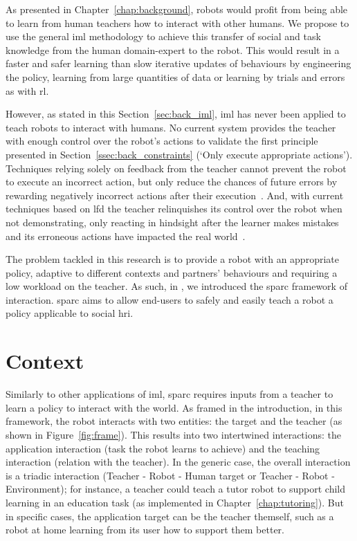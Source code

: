As presented in Chapter~\ref{chap:background}, robots would profit from being able to learn from human teachers how to interact with other humans. We propose to use the general \gls{iml} methodology to achieve this transfer of social and task knowledge from the human domain-expert to the robot. This would result in a faster and safer learning than slow iterative updates of behaviours by engineering the policy, learning from large quantities of data or learning by trials and errors as with \gls{rl}.

However, as stated in this Section~\ref{sec:back_iml}, \gls{iml} has never been applied to teach robots to interact with humans. No current system provides the teacher with enough control over the robot's actions to validate the first principle presented in Section~\ref{ssec:back_constraints} (`Only execute appropriate actions'). Techniques relying solely on feedback from the teacher cannot prevent the robot to execute an incorrect action, but only reduce the chances of future errors by rewarding negatively incorrect actions after their execution~\citep{senft2017supervised}. And, with current techniques based on \gls{lfd} the teacher relinquishes its control over the robot when not demonstrating, only reacting in hindsight after the learner makes mistakes and its erroneous actions have impacted the real world~\citep{chernova2009interactive}.

The problem tackled in this research is to provide a robot with an appropriate policy, adaptive to different contexts and partners' behaviours and requiring a low workload on the teacher. As such, in \cite{senft2015sparc}, we introduced the \gls{sparc} framework of interaction. \gls{sparc} aims to allow end-users to safely and easily teach a robot a policy applicable to social \gls{hri}.

\section{Context}

Similarly to other applications of \gls{iml}, \gls{sparc} requires inputs from a teacher to learn a policy to interact with the world. As framed in the introduction, in this framework, the robot interacts with two entities: the target and the teacher (as shown in Figure~\ref{fig:frame}). This results into two intertwined interactions: the application interaction (task the robot learns to achieve) and the teaching interaction (relation with the teacher). In the generic case, the overall interaction is a triadic interaction (Teacher - Robot - Human target or Teacher - Robot - Environment); for instance, a teacher could teach a tutor robot to support child learning in an education task (as implemented in Chapter~\ref{chap:tutoring}). But in specific cases, the application target can be the teacher themself, such as a robot at home learning from its user how to support them better.

